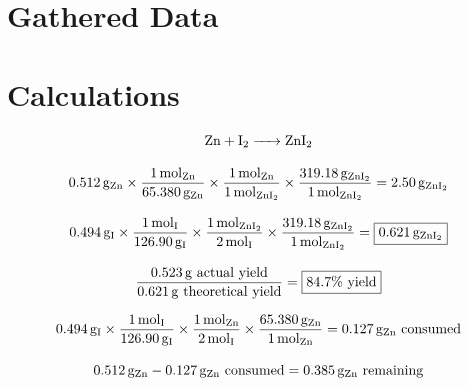 \documentclass[titlepage]{article}
\begin{document}
%

\section{Gathered Data}

\section{Calculations}
\begin{gather*}
    \ce{Zn + I2 -> ZnI2} \\[2ex]
    \SI{0.512}{\gram\of{Zn}}\times\frac{\SI{1}{\mol\of{Zn}}}{\SI{65.380}{\gram\of{Zn}}}\times\frac{\SI{1}{\mol\of{Zn}}}{\SI{1}{\mol\of{\ce{ZnI2}}}}\times\frac{\SI{319.18}{\gram\of{\ce{ZnI2}}}}{\SI{1}{\mol\of{\ce{ZnI2}}}}=\SI{2.50}{\gram\of{\ce{ZnI2}}} \\[2ex]
    \SI{0.494}{\gram\of{I}}\times\frac{\SI{1}{\mol\of{I}}}{\SI{126.90}{\gram\of{I}}}\times\frac{\SI{1}{\mol\of{\ce{ZnI2}}}}{\SI{2}{\mol\of{I}}}\times\frac{\SI{319.18}{\gram\of{\ce{ZnI2}}}}{\SI{1}{\mol\of{\ce{ZnI2}}}}=\boxed{\SI{0.621}{\gram\of{\ce{ZnI2}}}} \\[2ex]
    \frac{\SI{0.523}{\gram}\mathrm{\ actual\ yield}}{\SI{0.621}{\gram}\mathrm{\ theoretical\ yield}}=\boxed{84.7\unit{\percent}\mathrm{\ yield}}
\end{gather*}

\begin{gather*}
    \SI{0.494}{\gram\of{I}}\times\frac{\SI{1}{\mol\of{I}}}{\SI{126.90}{\gram\of{I}}}\times\frac{\SI{1}{\mol\of{Zn}}}{\SI{2}{\mol\of{I}}}\times\frac{\SI{65.380}{\gram\of{Zn}}}{\SI{1}{\mol\of{Zn}}}=\SI{0.127}{\gram\of{Zn}}\mathrm{\ consumed} \\[2ex]
    \SI{0.512}{\gram\of{Zn}}-\SI{0.127}{\gram\of{Zn}}\mathrm{\ consumed}=\SI{0.385}{\gram\of{Zn}}\mathrm{\ remaining}
\end{gather*}
\end{document}
